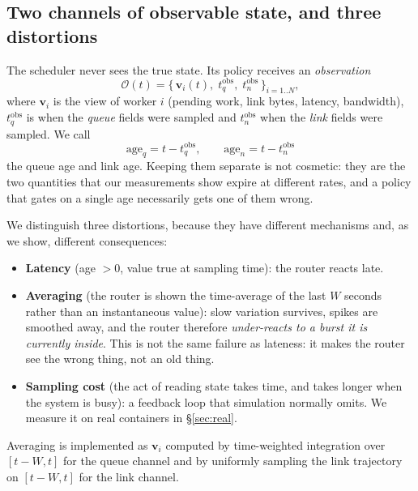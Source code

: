 \subsection{Two channels of observable state, and three distortions}
The scheduler never sees the true state. Its policy receives an \emph{observation}
\begin{equation}
  \mathcal{O}(t) = \big\{\, \mathbf{v}_i(t),\; t^{\text{obs}}_q,\; t^{\text{obs}}_n \,\big\}_{i=1..N},
\end{equation}
where $\mathbf{v}_i$ is the view of worker $i$ (pending work, link bytes, latency, bandwidth),
$t^{\text{obs}}_q$ is when the \emph{queue} fields were sampled and $t^{\text{obs}}_n$ when the
\emph{link} fields were sampled. We call
\begin{equation}
  \text{age}_q = t - t^{\text{obs}}_q, \qquad \text{age}_n = t - t^{\text{obs}}_n
\end{equation}
the queue age and link age. Keeping them separate is not cosmetic: they are the two quantities
that our measurements show expire at different rates, and a policy that gates on a single age
necessarily gets one of them wrong.

We distinguish three distortions, because they have different mechanisms and, as we show,
different consequences:
\begin{itemize}
  \item \textbf{Latency} (age $>0$, value true at sampling time): the router reacts late.
  \item \textbf{Averaging} (the router is shown the time-average of the last $W$ seconds rather
        than an instantaneous value): slow variation survives, spikes are smoothed away, and the
        router therefore \emph{under-reacts to a burst it is currently inside}. This is not the
        same failure as lateness: it makes the router see the wrong thing, not an old thing.
  \item \textbf{Sampling cost} (the act of reading state takes time, and takes longer when the
        system is busy): a feedback loop that simulation normally omits. We measure it on real
        containers in \S\ref{sec:real}.
\end{itemize}
Averaging is implemented as $\mathbf{v}_i$ computed by time-weighted integration over
$[t-W, t]$ for the queue channel and by uniformly sampling the link trajectory on $[t-W,t]$ for
the link channel.

